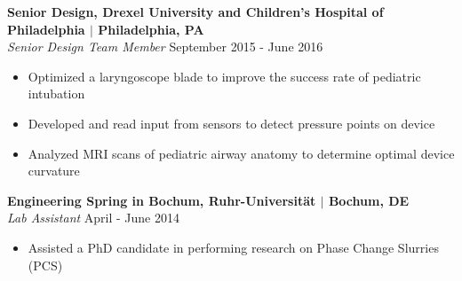\documentclass[line,resmargin,11pt]{res}
\begin{document}
\begin{resume}
\textbf{Senior Design, Drexel University and Children's Hospital of Philadelphia $|$ Philadelphia, PA} \\
{\sl Senior Design Team Member} \hfill September 2015 - June 2016 \\
\begin{itemize} \itemsep -2pt
	\item  Optimized a laryngoscope blade to improve the success rate of pediatric intubation
	\item  Developed and read input from sensors to detect pressure points on device
	\item  Analyzed MRI scans of pediatric airway anatomy to determine optimal device curvature
\end{itemize}

\textbf{Engineering Spring in Bochum, Ruhr-Universit{\"a}t $|$ Bochum, DE} \\
{\sl Lab Assistant} \hfill April - June 2014 \\
\begin{itemize} \itemsep -2pt
	\item  Assisted a PhD candidate in performing research on Phase Change Slurries (PCS)
\end{itemize}

\end{resume}
\end{document}
